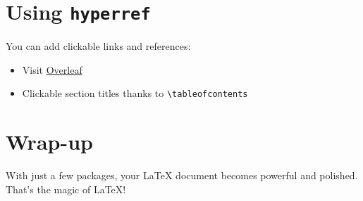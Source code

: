 \documentclass{article}
\begin{document}
\section{Using \texttt{hyperref}}
You can add clickable links and references:
\begin{itemize}
    \item Visit \href{https://www.overleaf.com}{Overleaf}
    \item Clickable section titles thanks to \texttt{\textbackslash tableofcontents}
\end{itemize}

\section{Wrap-up}
With just a few packages, your LaTeX document becomes powerful and polished. That’s the magic of LaTeX!
\end{document}
